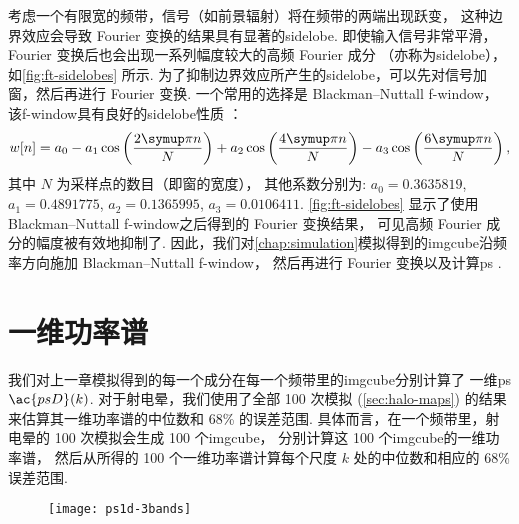 考虑一个有限宽的频带，信号（如前景辐射）将在频带的两端出现跃变，
这种边界效应会导致 Fourier 变换的结果具有显著的\ac{sidelobe}.
即使输入信号非常平滑，Fourier 变换后也会出现一系列幅度较大的高频 Fourier 成分
（亦称为\ac{sidelobe}），如\autoref{fig:ft-sidelobes} 所示.
为了抑制边界效应所产生的\ac{sidelobe}，可以先对信号加窗，然后再进行 Fourier 变换.
一个常用的选择是 Blackman--Nuttall \ac{f-window}，
该\ac{f-window}具有良好的\ac{sidelobe}性质 \cite{nuttall1981}：
\begin{equation}
  \label{eq:bn-window}
  w[n] = a_0 - a_1 \cos\left(\frac{2\Cpi n}{N}\right)
    + a_2 \cos\left(\frac{4\Cpi n}{N}\right)
    - a_3 \cos\left(\frac{6\Cpi n}{N}\right) ,
\end{equation}
其中
$N$ 为采样点的数目（即窗的宽度），
其他系数分别为:
$a_0 = \num{0.3635819}$,
$a_1 = \num{0.4891775}$,
$a_2 = \num{0.1365995}$,
$a_3 = \num{0.0106411}$.
\autoref{fig:ft-sidelobes} 显示了使用 Blackman--Nuttall 
\ac{f-window}之后得到的 Fourier 变换结果，
可见高频 Fourier 成分的幅度被有效地抑制了.
因此，我们对\autoref{chap:simulation}模拟得到的\ac{imgcube}沿频率方向施加
Blackman--Nuttall \ac{f-window}，
然后再进行 Fourier 变换以及计算\ac{ps} \cite{trott2015,chapman2016}.


\section{一维功率谱}
\label{sec:ps1d}

我们对上一章模拟得到的每一个成分在每一个频带里的\ac{imgcube}分别计算了
一维\ac{ps} $\ac{psD}(k)$.
对于射电晕，我们使用了全部 100 次模拟 (\autoref{sec:halo-maps}) 的结果
来估算其一维功率谱的中位数和 68\% 的误差范围.
具体而言，在一个频带里，射电晕的 100 次模拟会生成 100 个\ac{imgcube}，
分别计算这 100 个\ac{imgcube}的一维功率谱，
然后从所得的 100 个一维功率谱计算每个尺度 $k$ 处的中位数和相应的 68\% 误差范围.

\begin{figure}[htp]
  \centering
  \texttt{[image: ps1d-3bands]}
  \label{fig:ps1d-3bands}
\end{figure}

